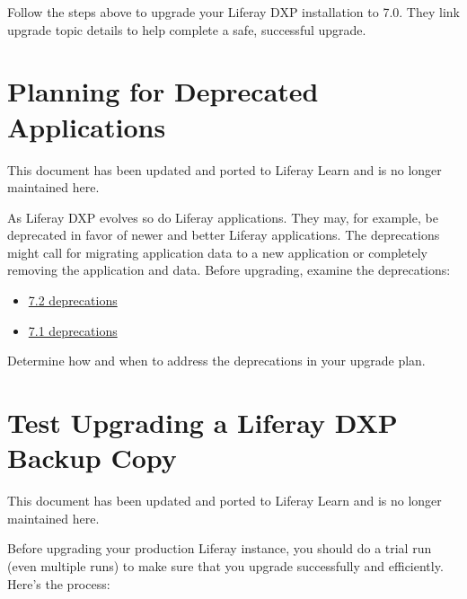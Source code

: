 Follow the steps above to upgrade your Liferay DXP installation to 7.0.
They link upgrade topic details to help complete a safe, successful
upgrade.

\chapter{Planning for Deprecated
Applications}\label{planning-for-deprecated-applications}

{This document has been updated and ported to Liferay Learn and is no
longer maintained here.}

As Liferay DXP evolves so do Liferay applications. They may, for
example, be deprecated in favor of newer and better Liferay
applications. The deprecations might call for migrating application data
to a new application or completely removing the application and data.
Before upgrading, examine the deprecations:

\begin{itemize}
\item
  \href{/docs/7-2/deploy/-/knowledge_base/d/deprecated-apps-in-7-2-what-to-do}{7.2
  deprecations}
\item
  \href{/docs/7-1/deploy/-/knowledge_base/d/deprecated-apps-in-7-1-what-to-do}{7.1
  deprecations}
\end{itemize}

Determine how and when to address the deprecations in your upgrade plan.

\chapter{Test Upgrading a Liferay DXP Backup
Copy}\label{test-upgrading-a-liferay-dxp-backup-copy}

{This document has been updated and ported to Liferay Learn and is no
longer maintained here.}

Before upgrading your production Liferay instance, you should do a trial
run (even multiple runs) to make sure that you upgrade successfully and
efficiently. Here's the process:

